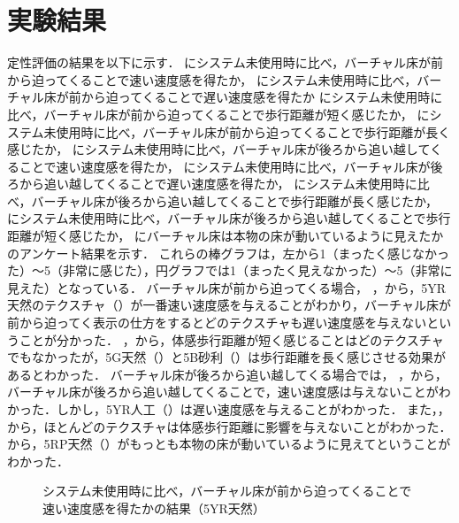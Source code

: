 \section{実験結果}
定性評価の結果を以下に示す．
にシステム未使用時に比べ，バーチャル床が前から迫ってくることで速い速度感を得たか，
にシステム未使用時に比べ，バーチャル床が前から迫ってくることで遅い速度感を得たか
にシステム未使用時に比べ，バーチャル床が前から迫ってくることで歩行距離が短く感じたか，
にシステム未使用時に比べ，バーチャル床が前から迫ってくることで歩行距離が長く感じたか，
にシステム未使用時に比べ，バーチャル床が後ろから追い越してくることで速い速度感を得たか，
にシステム未使用時に比べ，バーチャル床が後ろから追い越してくることで遅い速度感を得たか，
にシステム未使用時に比べ，バーチャル床が後ろから追い越してくることで歩行距離が長く感じたか，
にシステム未使用時に比べ，バーチャル床が後ろから追い越してくることで歩行距離が短く感じたか，
にバーチャル床は本物の床が動いているように見えたかのアンケート結果を示す．
これらの棒グラフは，左から1（まったく感じなかった）～5（非常に感じた），円グラフでは1（まったく見えなかった）～5（非常に見えた）となっている．
バーチャル床が前から迫ってくる場合，
，から，5YR天然のテクスチャ（）が一番速い速度感を与えることがわかり，バーチャル床が前から迫ってく表示の仕方をするとどのテクスチャも遅い速度感を与えないということが分かった．
，から，体感歩行距離が短く感じることはどのテクスチャでもなかったが，5G天然（）と5B砂利（）は歩行距離を長く感じさせる効果があるとわかった．
バーチャル床が後ろから追い越してくる場合では，
，から，バーチャル床が後ろから追い越してくることで，速い速度感は与えないことがわかった．しかし，5YR人工（）は遅い速度感を与えることがわかった．
また，，から，ほとんどのテクスチャは体感歩行距離に影響を与えないことがわかった．
から，5RP天然（）がもっとも本物の床が動いているように見えてということがわかった．
\begin{figure}[H]
    \centering
    \caption{システム未使用時に比べ，バーチャル床が前から迫ってくることで速い速度感を得たかの結果（5YR天然）}
    \label{fig:ff5yr}
\end{figure}
